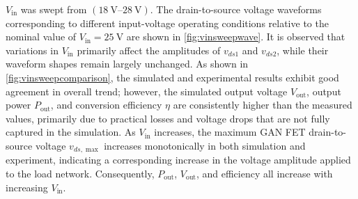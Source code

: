 \documentclass[journal, 9pt, letterpaper, english]{IEEEtran}[2015/08/26]
\begin{document}
$V_{\mathrm{in}}$ was swept from $\left(\qtyrange{18}{28}{\volt}\right)$.
The drain-to-source voltage waveforms corresponding to different input-voltage operating conditions relative to the nominal value of $V_{\mathrm{in}} = \qty{25}{\volt}$ are shown in \cref{fig:vinsweepwave}.
It is observed that variations in $V_{\mathrm{in}}$ primarily affect the amplitudes of $v_{ds1}$ and $v_{ds2}$, while their waveform shapes remain largely unchanged.
As shown in \cref{fig:vinsweepcomparison}, the simulated and experimental results exhibit good agreement in overall trend; however, the simulated output voltage $V_{\mathrm{out}}$, output power $P_{\mathrm{out}}$, and conversion efficiency $\eta$ are consistently higher than the measured values, primarily due to practical losses and voltage drops that are not fully captured in the simulation.
As $V_{\mathrm{in}}$ increases, the maximum GAN FET drain-to-source voltage $v_{ds,\max}$ increases monotonically in both simulation and experiment, indicating a corresponding increase in the voltage amplitude applied to the load network.
Consequently, $P_{\mathrm{out}}$, $V_{\mathrm{out}}$, and efficiency all increase with increasing $V_{\mathrm{in}}$.
\end{document}
